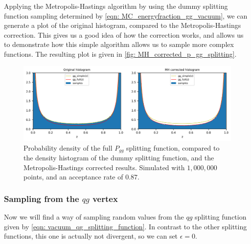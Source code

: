 \documentclass[main.tex]{subfiles}
\begin{document}

Applying the Metropolis-Hastings algorithm by using the dummy splitting function sampling determined by \autoref{eqn: MC_energyfraction_gg_vacuum}, we can generate a plot of the original histogram, compared to the Metropolis-Hastings correction. This gives us a good idea of how the correction works, and allows us to demonstrate how this simple algorithm allows us to sample more complex functions. The resulting plot is given in \autoref{fig: MH_corrected_p_gg_splitting}.
\begin{figure}[htb]
    \centering
    \includegraphics[width=15cm]{pictures/plots/Metropolis-Hastings/MH_vacuum_gg.png}
    \caption{Probability density of the full \(P_{gg}\) splitting function, compared to the density histogram of the dummy splitting function, and the Metropolis-Hastings corrected results. Simulated with \(1,000,000\) points, and an acceptance rate of \(0.87\).}
    \label{fig: MH_corrected_p_gg_splitting}
\end{figure}

\subsubsection*{Sampling from the \(qg\) vertex}
Now we will find a way of sampling random values from the \(qg\) splitting function given by \autoref{eqn: vacuum_qg_splitting_function}. In contrast to the other splitting functions, this one is actually not divergent, so we can set \(\epsilon = 0\). 
\end{document}
